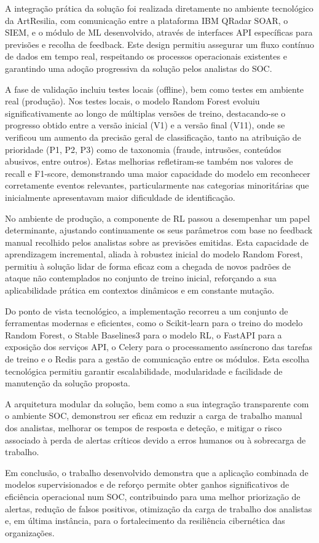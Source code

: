 \begin{abstractotherlanguage}
A integração prática da solução foi realizada diretamente no ambiente tecnológico da ArtResilia, com comunicação entre a plataforma IBM QRadar SOAR, o SIEM, e o módulo de ML desenvolvido, através de interfaces API específicas para previsões e recolha de feedback. 
Este design permitiu assegurar um fluxo contínuo de dados em tempo real, respeitando os processos operacionais existentes e garantindo uma adoção progressiva da solução pelos analistas do SOC.

A fase de validação incluiu testes locais (offline), bem como testes em ambiente real (produção). 
Nos testes locais, o modelo Random Forest evoluiu significativamente ao longo de múltiplas versões de treino, destacando-se o progresso obtido entre a versão inicial (V1) e a versão final (V11), onde se verificou um aumento da precisão geral de classificação, tanto na atribuição de prioridade (P1, P2, P3) como de taxonomia (fraude, intrusões, conteúdos abusivos, entre outros). 
Estas melhorias refletiram-se também nos valores de recall e F1-score, demonstrando uma maior capacidade do modelo em reconhecer corretamente eventos relevantes, particularmente nas categorias minoritárias que inicialmente apresentavam maior dificuldade de identificação.

No ambiente de produção, a componente de RL passou a desempenhar um papel determinante, ajustando continuamente os seus parâmetros com base no feedback manual recolhido pelos analistas sobre as previsões emitidas. 
Esta capacidade de aprendizagem incremental, aliada à robustez inicial do modelo Random Forest, permitiu à solução lidar de forma eficaz com a chegada de novos padrões de ataque não contemplados no conjunto de treino inicial, reforçando a sua aplicabilidade prática em contextos dinâmicos e em constante mutação.

Do ponto de vista tecnológico, a implementação recorreu a um conjunto de ferramentas modernas e eficientes, como o Scikit-learn para o treino do modelo Random Forest, o Stable Baselines3 para o modelo RL, o FastAPI para a exposição dos serviços API, o Celery para o processamento assíncrono das tarefas de treino e o Redis para a gestão de comunicação entre os módulos. 
Esta escolha tecnológica permitiu garantir escalabilidade, modularidade e facilidade de manutenção da solução proposta.

A arquitetura modular da solução, bem como a sua integração transparente com o ambiente SOC, demonstrou ser eficaz em reduzir a carga de trabalho manual dos analistas, melhorar os tempos de resposta e deteção, e mitigar o risco associado à perda de alertas críticos devido a erros humanos ou à sobrecarga de trabalho.

Em conclusão, o trabalho desenvolvido demonstra que a aplicação combinada de modelos supervisionados e de reforço permite obter ganhos significativos de eficiência operacional num SOC, contribuindo para uma melhor priorização de alertas, redução de falsos positivos, otimização da carga de trabalho dos analistas e, em última instância, para o fortalecimento da resiliência cibernética das organizações. 

\end{abstractotherlanguage}

